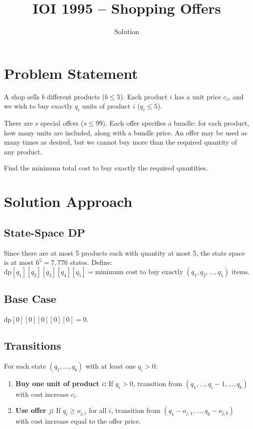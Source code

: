 \documentclass[11pt,a4paper]{article}
\title{IOI 1995 -- Shopping Offers}
\author{Solution}
\date{}
\begin{document}
\maketitle

\section{Problem Statement}

A shop sells $b$ different products ($b \le 5$). Each product $i$ has a unit
price $c_i$, and we wish to buy exactly $q_i$ units of product $i$ ($q_i \le 5$).

There are $s$ special offers ($s \le 99$). Each offer specifies a bundle: for each product,
how many units are included, along with a bundle price. An offer may be used as many times
as desired, but we cannot buy more than the required quantity of any product.

Find the minimum total cost to buy exactly the required quantities.

\section{Solution Approach}

\subsection{State-Space DP}

Since there are at most 5 products each with quantity at most 5, the state space is
at most $6^5 = 7{,}776$ states. Define:
\[
  \mathrm{dp}[q_1][q_2][q_3][q_4][q_5] = \text{minimum cost to buy exactly } (q_1, q_2, \ldots, q_5) \text{ items.}
\]

\subsection{Base Case}
$\mathrm{dp}[0][0][0][0][0] = 0$.

\subsection{Transitions}
For each state $(q_1, \ldots, q_b)$ with at least one $q_i > 0$:
\begin{enumerate}
  \item \textbf{Buy one unit of product $i$:} If $q_i > 0$, transition from
    $(q_1, \ldots, q_i - 1, \ldots, q_b)$ with cost increase $c_i$.
  \item \textbf{Use offer $j$:} If $q_i \ge o_{j,i}$ for all $i$, transition from
    $(q_1 - o_{j,1}, \ldots, q_b - o_{j,b})$ with cost increase equal to the offer price.
\end{enumerate}
\end{document}
